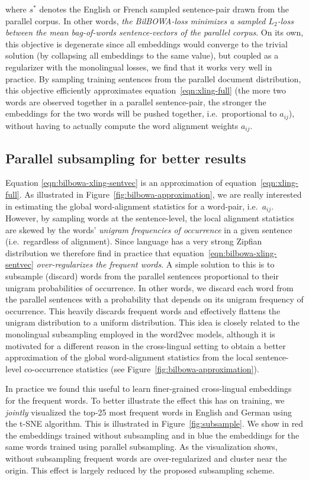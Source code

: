 \documentclass[10pt]{article}
\begin{document}
where $s^*$ denotes the English or French sampled sentence-pair drawn from the
parallel corpus.  In other words, \emph{the BilBOWA-loss minimizes a sampled
$L_2$-loss between the mean bag-of-words sentence-vectors of the parallel corpus}.
On its own, this objective is degenerate since all embeddings would converge to
the trivial solution (by collapsing all embeddings to the same value), but
coupled as a regularizer with the monolingual losses, we find that it works
very well in practice. By sampling training sentences from the parallel document
distribution, this objective efficiently approximates equation~\ref{eqn:xling-full} 
(the more two words are observed together in a parallel sentence-pair, the
stronger the embeddings for the two words will be pushed together, i.e.\
proportional to $a_{ij}$), without having to actually compute the word 
alignment weights $a_{ij}$.

\subsection{Parallel subsampling for better results}
Equation \ref{eqn:bilbowa-xling-sentvec} is an approximation of
equation~\ref{eqn:xling-full}.  As illustrated in
Figure~\ref{fig:bilbowa-approximation}, we are really interested in estimating
the global word-alignment statistics for a word-pair, i.e.\ $a_{ij}$.
However, by sampling words at the sentence-level, the local alignment
statistics are skewed by the words' \emph{unigram frequencies of occurrence} in
a given sentence (i.e.\ regardless of alignment). Since language has a very
strong Zipfian distribution we therefore find in practice that
equation~\ref{eqn:bilbowa-xling-sentvec} \emph{over-regularizes the frequent
words}.  A simple solution to this is to subsample (discard) words from the
parallel sentences proportional to their unigram probabilities of occurrence.
In other words, we discard each word from the parallel sentences with a probability 
that depends on its unigram frequency of occurrence. This heavily discards frequent words
and effectively flattens the unigram distribution to a uniform distribution. This idea
is closely related to the monolingual subsampling employed in the word2vec models,
although it is motivated for a different reason in the cross-lingual setting to obtain 
a better approximation of the global word-alignment statistics from the local sentence-level 
co-occurrence statistics (see Figure~\ref{fig:bilbowa-approximation}).

In practice we found this useful to learn finer-grained cross-lingual embeddings
for the frequent words. To better illustrate the effect this has on training,
we \emph{jointly} visualized the top-25
most frequent words in English and German using the t-SNE algorithm. This is
illustrated in Figure~\ref{fig:subsample}.  We show in red the embeddings
trained without subsampling and in blue the embeddings for the same words trained 
using parallel subsampling. As the visualization shows, without subsampling frequent words are
over-regularized and cluster near the origin. This effect is largely reduced by
the proposed subsampling scheme.
\end{document}
